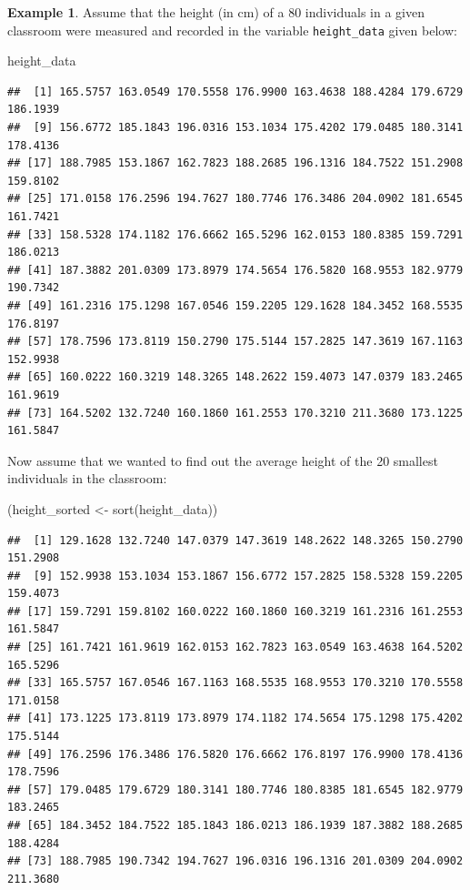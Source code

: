 \documentclass[
]{book}
\newenvironment{Shaded}{\begin{snugshade}}{\end{snugshade}}
\newcommand{\FunctionTok}[1]{\textcolor[rgb]{0.00,0.00,0.00}{#1}}
\newcommand{\NormalTok}[1]{#1}
\newcommand{\OtherTok}[1]{\textcolor[rgb]{0.56,0.35,0.01}{#1}}
\theoremstyle{definition}
\theoremstyle{definition}
\newtheorem{example}{Example}[chapter]
\theoremstyle{definition}
\theoremstyle{definition}
\theoremstyle{remark}
\begin{document}
\begin{example}

Assume that the height (in cm) of a 80 individuals in a given classroom were measured and recorded in the variable \texttt{height\_data} given below:

\begin{Shaded}
\begin{Highlighting}[]
\NormalTok{height\_data}
\end{Highlighting}
\end{Shaded}

\begin{verbatim}
##  [1] 165.5757 163.0549 170.5558 176.9900 163.4638 188.4284 179.6729 186.1939
##  [9] 156.6772 185.1843 196.0316 153.1034 175.4202 179.0485 180.3141 178.4136
## [17] 188.7985 153.1867 162.7823 188.2685 196.1316 184.7522 151.2908 159.8102
## [25] 171.0158 176.2596 194.7627 180.7746 176.3486 204.0902 181.6545 161.7421
## [33] 158.5328 174.1182 176.6662 165.5296 162.0153 180.8385 159.7291 186.0213
## [41] 187.3882 201.0309 173.8979 174.5654 176.5820 168.9553 182.9779 190.7342
## [49] 161.2316 175.1298 167.0546 159.2205 129.1628 184.3452 168.5535 176.8197
## [57] 178.7596 173.8119 150.2790 175.5144 157.2825 147.3619 167.1163 152.9938
## [65] 160.0222 160.3219 148.3265 148.2622 159.4073 147.0379 183.2465 161.9619
## [73] 164.5202 132.7240 160.1860 161.2553 170.3210 211.3680 173.1225 161.5847
\end{verbatim}

Now assume that we wanted to find out the average height of the 20 smallest individuals in the classroom:

\begin{Shaded}
\begin{Highlighting}[]
\NormalTok{(height\_sorted }\OtherTok{\textless{}{-}} \FunctionTok{sort}\NormalTok{(height\_data))}
\end{Highlighting}
\end{Shaded}

\begin{verbatim}
##  [1] 129.1628 132.7240 147.0379 147.3619 148.2622 148.3265 150.2790 151.2908
##  [9] 152.9938 153.1034 153.1867 156.6772 157.2825 158.5328 159.2205 159.4073
## [17] 159.7291 159.8102 160.0222 160.1860 160.3219 161.2316 161.2553 161.5847
## [25] 161.7421 161.9619 162.0153 162.7823 163.0549 163.4638 164.5202 165.5296
## [33] 165.5757 167.0546 167.1163 168.5535 168.9553 170.3210 170.5558 171.0158
## [41] 173.1225 173.8119 173.8979 174.1182 174.5654 175.1298 175.4202 175.5144
## [49] 176.2596 176.3486 176.5820 176.6662 176.8197 176.9900 178.4136 178.7596
## [57] 179.0485 179.6729 180.3141 180.7746 180.8385 181.6545 182.9779 183.2465
## [65] 184.3452 184.7522 185.1843 186.0213 186.1939 187.3882 188.2685 188.4284
## [73] 188.7985 190.7342 194.7627 196.0316 196.1316 201.0309 204.0902 211.3680
\end{verbatim}


\end{example}
\end{document}
